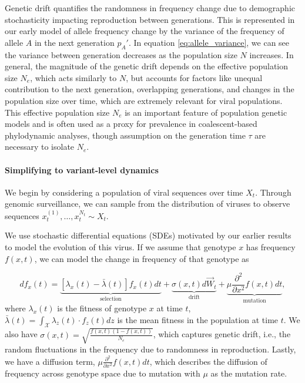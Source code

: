 Genetic drift quantifies the randomness in frequency change due to demographic stochasticity impacting reproduction between generations.
This is represented in our early model of allele frequency change by the variance of the frequency of allele $A$ in the next generation $p_A'$.
In equation \ref{eq:allele_variance}, we can see the variance between generation decreases as the population size $N$ increases.
In general, the magnitude of the genetic drift depends on the effective population size $N_e$, which acts similarly to $N$, but accounts for factors like unequal contribution to the next generation, overlapping generations, and changes in the population size over time, which are extremely relevant for viral populations.
This effective population size $N_e$ is an important feature of population genetic models and is often used as a proxy for prevalence in coalescent-based phylodynamic analyses, though assumption on the generation time $\tau$ are necessary to isolate $N_e$. \cite{MullerWagner2021}

\paragraph{Simplifying to variant-level dynamics}

We begin by considering a population of viral sequences over time $X_t$.
Through genomic surveillance, we can sample from the distribution of viruses to observe sequences $x_t^{(1)}, \ldots, x_t^{{N_t}} \sim X_t$.

We use stochastic differential equations (SDEs) motivated by our earlier results to model the evolution of this virus.
If we assume that genotype $x$ has frequency $f(x, t)$, we can model the change in frequency of that genotype as

\begin{equation}
  df_x(t) = \underbrace{\left[\lambda_{x}(t) - \bar{\lambda}(t)\right] f_x(t) dt}_{\text{selection}} + \underbrace{\sigma(x, t) d\vec{W}_{t}}_{\text{drift}} + \underbrace{\mu \frac{\partial^2 }{\partial x^2} f(x,t) dt}_{\text{mutation}},
\end{equation}
where $\lambda_x(t)$ is the fitness of genotype $x$ at time $t$, $\bar{\lambda}(t) = \int_{\mathcal{X}} \lambda_z(t)\cdot f_z(t) dz$ is the mean fitness in the population at time $t$.
We also have $\sigma(x, t) = \sqrt{\frac{f(x,t) (1 - f(x,t))}{N_e}}$, which captures genetic drift, i.e., the random fluctuations in the frequency due to randomness in reproduction.
Lastly, we have a diffusion term, $\mu \frac{\partial^2 }{\partial x^2} f(x,t) dt$, which describes the diffusion of frequency across genotype space due to mutation with $\mu$ as the mutation rate.

